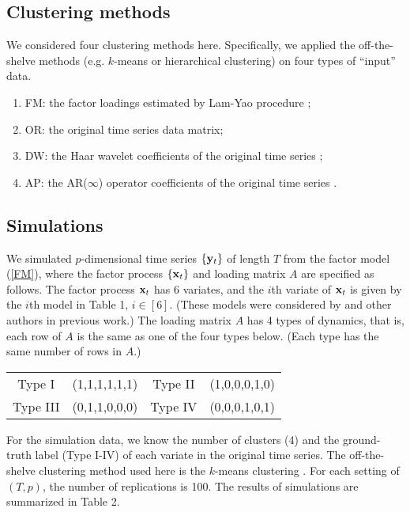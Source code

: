 \documentclass{article} %
\begin{document}
\subsection{Clustering methods}
We considered four clustering methods here. Specifically, we applied the off-the-shelve methods (e.g. $k$-means or hierarchical clustering) on four types of ``input'' data. 
\begin{enumerate}
\item FM: the factor loadings estimated by Lam-Yao procedure \citep{ly_fm12};
\item OR: the original time series data matrix;
\item DW: the Haar wavelet coefficients of the original time series \citep{wt_05};
\item AP: the AR($\infty$) operator coefficients of the original time series \citep{dp_90}. 
\end{enumerate}

\subsection{Simulations}
We simulated $p$-dimensional time series $\{{\bf y}_t\}$ of length $T$ from the factor model (\ref{FM}), where the factor process $\{{\bf x}_t\}$ and  loading matrix $A$ are specified as follows. The factor process ${\bf x}_t$ has 6 variates, and the $i$th variate of ${\bf x}_t$ is given by the $i$th model in Table 1, $i\in[6]$. (These models were considered by \cite{nf_10} and other authors in previous work.) The loading matrix $A$ has 4 types of dynamics, that is, each row of $A$ is the same as one of the four types below. (Each type has the same number of rows in $A$.)
\begin{center}
\begin{tabular}{cccc}
\hline
Type I & (1,1,1,1,1,1) & Type II & (1,0,0,0,1,0)\\
Type III & (0,1,1,0,0,0) & Type IV & (0,0,0,1,0,1)\\
\hline
\end{tabular}
\end{center}     
For the simulation data, we know the number of clusters (4) and the ground-truth label (Type I-IV) of each variate in the original time series. The off-the-shelve clustering method used here is the $k$-means clustering \citep{KM_79}. For each setting of $(T,p)$, the number of replications is 100. The results of simulations are summarized in Table 2.
\end{document}
